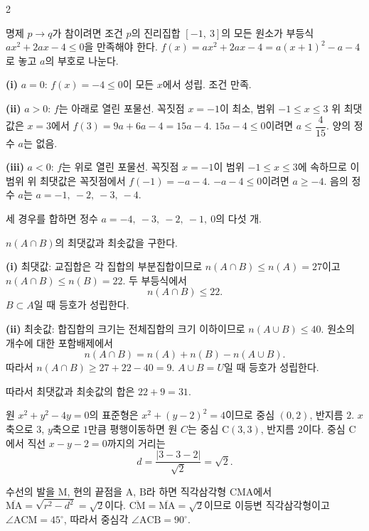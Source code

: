 \documentclass[10pt,fleqn]{article}
\renewcommand{\solpart}[1]{%
  \par\addvspace{10pt}\noindent
  {\sffamily\bfseries\color{black}(#1)}\hspace{3mm}\ignorespaces%
}
\begin{document}
\begin{multicols}{2}

명제 $p \to q$가 참이려면 조건 $p$의 진리집합 $[-1,\ 3]$의 모든 원소가 부등식 $ax^{2} + 2ax - 4 \le 0$을 만족해야 한다. $f(x) = ax^{2} + 2ax - 4 = a(x+1)^{2} - a - 4$로 놓고 $a$의 부호로 나눈다.

\solpart{i} $a = 0$: $f(x) = -4 \le 0$이 모든 $x$에서 성립. 조건 만족.

\solpart{ii} $a > 0$: $f$는 아래로 열린 포물선. 꼭짓점 $x = -1$이 최소, 범위 $-1 \le x \le 3$ 위 최댓값은 $x = 3$에서 $f(3) = 9a + 6a - 4 = 15a - 4$.
$15a - 4 \le 0$이려면 $a \le \dfrac{4}{15}$. 양의 정수 $a$는 없음.

\solpart{iii} $a < 0$: $f$는 위로 열린 포물선. 꼭짓점 $x = -1$이 범위 $-1 \le x \le 3$에 속하므로 이 범위 위 최댓값은 꼭짓점에서 $f(-1) = -a - 4$.
$-a - 4 \le 0$이려면 $a \ge -4$. 음의 정수 $a$는 $a = -1,\ -2,\ -3,\ -4$.

세 경우를 합하면 정수 $a = -4,\ -3,\ -2,\ -1,\ 0$의 다섯 개.


$n(A \cap B)$의 최댓값과 최솟값을 구한다.

\solpart{i} 최댓값: 교집합은 각 집합의 부분집합이므로 $n(A \cap B) \le n(A) = 27$이고 $n(A \cap B) \le n(B) = 22$. 두 부등식에서
\[ n(A \cap B) \le 22. \]
$B \subset A$일 때 등호가 성립한다.

\solpart{ii} 최솟값: 합집합의 크기는 전체집합의 크기 이하이므로 $n(A \cup B) \le 40$. 원소의 개수에 대한 포함배제에서
\[ n(A \cap B) = n(A) + n(B) - n(A \cup B). \]
따라서 $n(A \cap B) \ge 27 + 22 - 40 = 9$.
$A \cup B = U$일 때 등호가 성립한다.

따라서 최댓값과 최솟값의 합은 $22 + 9 = 31$.


원 $x^{2} + y^{2} - 4y = 0$의 표준형은 $x^{2} + (y-2)^{2} = 4$이므로 중심 $(0, 2)$, 반지름 $2$. $x$축으로 $3$, $y$축으로 $1$만큼 평행이동하면 원 $C$는 중심 $\mathrm{C}(3, 3)$, 반지름 $2$이다. 중심 $\mathrm{C}$에서 직선 $x - y - 2 = 0$까지의 거리는
\[ d = \dfrac{|3 - 3 - 2|}{\sqrt{2}} = \sqrt{2}. \]

수선의 발을 $\mathrm{M}$, 현의 끝점을 $\mathrm{A}$, $\mathrm{B}$라 하면 직각삼각형 $\mathrm{CMA}$에서 $\overline{\mathrm{MA}} = \sqrt{r^{2} - d^{2}} = \sqrt{2}$이다. $\overline{\mathrm{CM}} = \overline{\mathrm{MA}} = \sqrt{2}$이므로 이등변 직각삼각형이고 $\angle\mathrm{ACM} = 45^\circ$, 따라서 중심각 $\angle\mathrm{ACB} = 90^\circ$.


\end{multicols}
\end{document}
